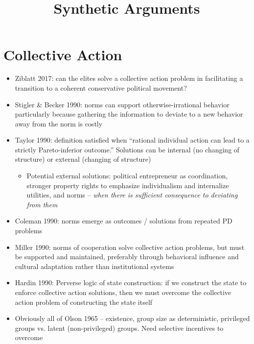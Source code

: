\documentclass[12pt]{article}
\title{\textbf{Synthetic Arguments}}
\begin{document}
\maketitle
\newpage









\section*{Collective Action}

\begin{itemize}
    \item Ziblatt 2017: can the elites solve a collective action problem in facilitating a transition to a coherent conservative political movement?
    \item Stigler \& Becker 1990: norms can support otherwise-irrational behavior particularly because gathering the information to deviate to a new behavior away from the norm is costly
    \item Taylor 1990: definition satisfied when ``rational individual action can lead to a strictly Pareto-inferior outcome.'' Solutions can be internal (no changing of structure) or external (changing of structure)
    \begin{itemize}
        \item Potential external solutions: political entrepreneur as coordination, stronger property rights to emphasize individualism and internalize utilities, and norms -- \emph{when there is sufficient consequence to deviating from them}
    \end{itemize}
    \item Coleman 1990: norms emerge as outcomes / solutions from repeated PD problems
    \item Miller 1990: norms of cooperation solve collective action problems, but must be supported and maintained, preferably through behavioral influence and cultural adaptation rather than institutional systems
    \item Hardin 1990: Perverse logic of state construction: if we construct the state to enforce collective action solutions, then we must overcome the collective action problem of constructing the state itself
    \item Obviously all of Olson 1965 -- existence, group size as deterministic, privileged groups vs. latent (non-privileged) groups. Need selective incentives to overcome

\end{itemize}
\end{document}
